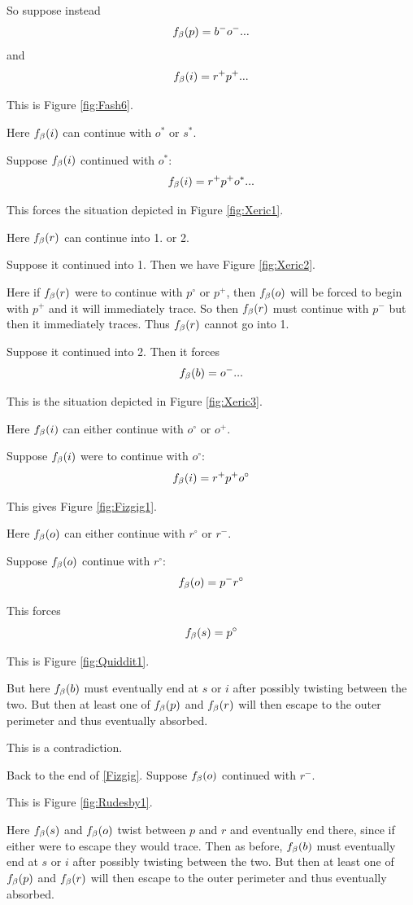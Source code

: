 So suppose instead 
$$f_\beta(p) = b^- o^-...$$
and
$$f_\beta(i) = r^+ p^+...$$

This is Figure \ref{fig:Fash6}.

Here $f_\beta(i)$ can continue with $o^*$ or $s^*$.

\label{Xeric}
Suppose $f_\beta(i)$ continued with $o^*$:
$$f_\beta(i) = r^+ p^+ o^*...$$

This forces the situation depicted in Figure \ref{fig:Xeric1}.

Here $f_\beta(r)$ can continue into 1. or 2.

Suppose it continued into 1. Then we have Figure \ref{fig:Xeric2}.

Here if $f_\beta(r)$ were to continue with $p^\circ$ or $p^+$, then $f_\beta(o)$ will be forced to begin with $p^+$ and it will immediately trace. So then $f_\beta(r)$ must continue with $p^-$ but then it immediately traces. Thus $f_\beta(r)$ cannot go into 1.

Suppose it continued into 2. Then it forces
$$f_\beta(b) = o^-...$$

This is the situation depicted in Figure \ref{fig:Xeric3}.

Here $f_\beta(i)$ can either continue with $o^\circ$ or $o^+$.

\label{Fizgig}
Suppose $f_\beta(i)$ were to continue with $o^\circ$:
$$f_\beta(i) = r^+ p^+ o^\circ$$

This gives Figure \ref{fig:Fizgig1}.

Here $f_\beta(o)$ can either continue with $r^\circ$ or $r^-$.

Suppose $f_\beta(o)$ continue with $r^\circ$:
$$f_\beta(o) = p^- r^\circ$$

This forces
$$f_\beta(s) = p^\circ$$

This is Figure \ref{fig:Quiddit1}.

But here $f_\beta(b)$ must eventually end at $s$ or $i$ after possibly twisting between the two. But then at least one of $f_\beta(p)$ and $f_\beta(r)$ will then escape to the outer perimeter and thus eventually absorbed.

This is a contradiction.


Back to the end of \ref{Fizgig}. Suppose $f_\beta(o)$ continued with $r^-$.

This is Figure \ref{fig:Rudesby1}.

Here $f_\beta(s)$ and $f_\beta(o)$ twist between $p$ and $r$ and eventually end there, since if either were to escape they would trace. Then as before,  $f_\beta(b)$ must eventually end at $s$ or $i$ after possibly twisting between the two. But then at least one of $f_\beta(p)$ and $f_\beta(r)$ will then escape to the outer perimeter and thus eventually absorbed.

